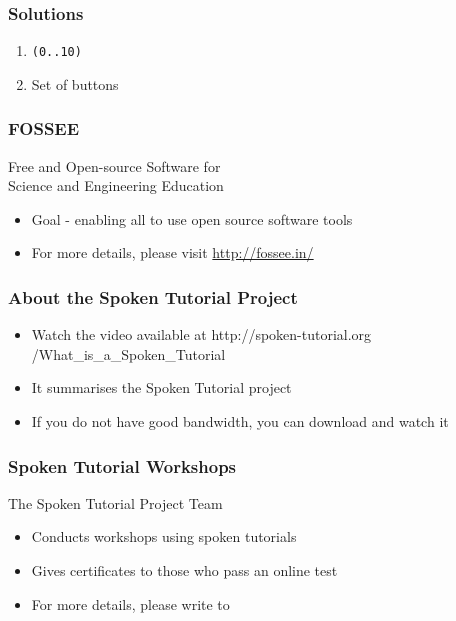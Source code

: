 \documentclass[17pt,compress]{beamer}
\begin{document}
\begin{frame}
\frametitle{Solutions}
\label{sec-8}


\begin{enumerate}
\item \texttt{(0..10)}\pause
\vspace{12pt}
\item Set of buttons
\end{enumerate}
\end{frame}
\begin{frame}
\frametitle{FOSSEE}
{\color{blue}Free and Open-source Software for \\Science and Engineering Education} \\
\begin{itemize}
\item Goal - enabling all to use open source software tools
\item For more details, please visit {\color{blue}\url{http://fossee.in/}}
\end{itemize}
\end{frame}
\begin{frame}
\frametitle{About the Spoken Tutorial Project}
\begin{itemize}
\item Watch the video available at {\color{blue}http://spoken-tutorial.org /What\_is\_a\_Spoken\_Tutorial}
\item It summarises the Spoken Tutorial project \pause
\item If you do not have good bandwidth, you can download and watch it
\end{itemize}
\end{frame}
\begin{frame}
\frametitle{Spoken Tutorial Workshops}The Spoken Tutorial Project Team 
\begin{itemize}
\item Conducts workshops using spoken tutorials 
\item Gives certificates to those who pass an online test 
\item For more details, please write to \\ 
\end{itemize}
\end{frame}
\end{document}
